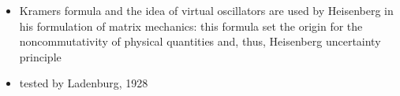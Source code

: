 \documentclass[letterpaper,10pt,english]{jupyterBook}
\begin{document}
\begin{itemize}
\begin{itemize}
\begin{itemize}
\item {} 
\sphinxAtStartPar
Kramers formula and the idea of virtual oscillators are used by Heisenberg in his formulation of matrix mechanics: this formula set the origin for the non\sphinxhyphen{}commutativity of physical quantities and, thus, Heisenberg uncertainty principle

\item {} 
\sphinxAtStartPar
tested by Ladenburg, 1928

\end{itemize}

\end{itemize}

\end{itemize}

\sphinxAtStartPar
{}
\end{document}
